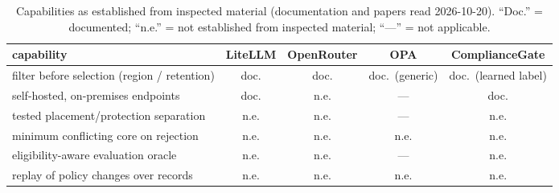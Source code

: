 \documentclass[11pt]{article}
\begin{document}
\begin{table}[t]
\centering
\small
\caption{Capabilities as established from inspected material (documentation and papers read
2026-10-20). ``Doc.'' = documented; ``n.e.'' = not established from inspected material; ``---'' = not applicable.}
\label{tab:compare}
\begin{tabular}{@{}p{4.6cm}cccc@{}}
\toprule
capability & LiteLLM & OpenRouter & OPA & ComplianceGate \\
\midrule
filter before selection (region / retention) & doc. & doc. & doc.\ (generic) & doc.\ (learned label) \\
self-hosted, on-premises endpoints & doc. & n.e. & --- & doc. \\
tested placement/protection separation & n.e. & n.e. & --- & n.e. \\
minimum conflicting core on rejection & n.e. & n.e. & n.e. & n.e. \\
eligibility-aware evaluation oracle & n.e. & n.e. & --- & n.e. \\
replay of policy changes over records & n.e. & n.e. & n.e. & n.e. \\
\bottomrule
\end{tabular}
\end{table}
\end{document}
